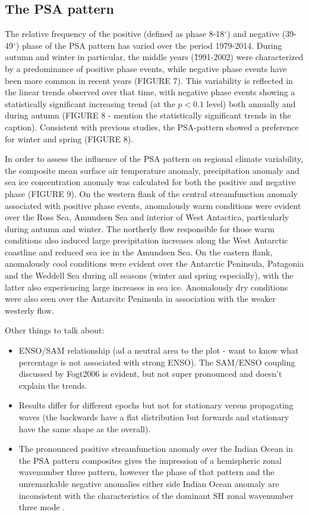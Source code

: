 \subsection{The PSA pattern}

The relative frequency of the positive (defined as phase 8-18$^{\circ}$) and negative (39-49$^{\circ}$) phase of the PSA pattern has varied over the period 1979-2014. During autumn and winter in particular, the middle years (\~1991-2002) were characterized by a predominance of positive phase events, while negative phase events have been more common in recent years (FIGURE 7). This variability is reflected in the linear trends observed over that time, with negative phase events showing a statistically significant increasing trend (at the $p < 0.1$ level) both annually and during autumn (FIGURE 8 - mention the statistically significant trends in the caption). Consistent with previous studies, the PSA-pattern showed a preference for winter and spring (FIGURE 8).

In order to assess the influence of the PSA pattern on regional climate variability, the composite mean surface air temperature anomaly, precipitation anomaly and sea ice concentration anomaly was calculated for both the positive and negative phase (FIGURE 9). On the western flank of the central streamfunction anomaly associated with positive phase events, anomalously warm conditions were evident over the Ross Sea, Amundsen Sea and interior of West Antactica, particularly during autumn and winter. The northerly flow responsible for those warm conditions also induced large precipitation increases along the West Antarctic coastline and reduced sea ice in the Amundsen Sea. On the eastern flank, anomalously cool conditions were evident over the Antarctic Peninsula, Patagonia and the Weddell Sea during all seasons (winter and spring especially), with the latter also experiencing large increases in sea ice. Anomalously dry conditions were also seen over the Antarcitc Peninsula in association with the weaker westerly flow. 

Other things to talk about:
\begin{itemize}
\item ENSO/SAM relationship (ad a neutral area to the plot - want to know what percentage is not associated with strong ENSO). The SAM/ENSO coupling discussed by Fogt2006 is evident, but not super pronounced and doesn't explain the trends.
\item Results differ for different epochs but not for stationary versus propagating waves (the backwards have a flat distribution but forwards and stationary have the same shape as the overall).
\item The pronounced positive streamfunction anomaly over the Indian Ocean in the PSA pattern composites gives the impression of a hemispheric zonal wavenumber three pattern, however the phase of that pattern and the unremarkable negative anomalies either side Indian Ocean anomaly are inconsistent with the characteristics of the dominant SH zonal wavenumber three mode \citep[e.g.][]{Raphael2004,IrvingSimmonds2015}.
\end{itemize}


